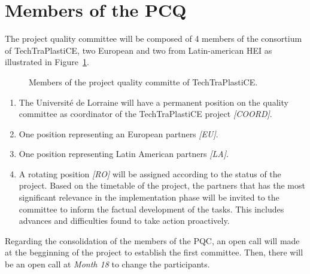 \documentclass[
  12pt,
  oneside]{book}
\providecommand{\tightlist}{%
  \setlength{\itemsep}{0pt}\setlength{\parskip}{0pt}}\usepackage{longtable,booktabs,array}
\begin{document}
\section{Members of the PCQ}\label{members-of-the-pcq}

The project quality committee will be composed of 4 members of the
consortium of TechTraPlastiCE, two European and two from Latin-american
HEI as illustrated in Figure~\ref{fig-members}.

\begin{figure}[H]


\caption{\label{fig-members}Members of the project quality committe of
TechTraPlastiCE.}

\end{figure}%

\begin{enumerate}
\def\labelenumi{\arabic{enumi}.}
\tightlist
\item
  The Université de Lorraine will have a permanent position on the
  quality committee as coordinator of the TechTraPlastiCE project
  \emph{{[}COORD{]}}.
\item
  One position representing an European partners \emph{{[}EU{]}}.
\item
  One position representing Latin American partners \emph{{[}LA{]}}.
\item
  A rotating position \emph{{[}RO{]}} will be assigned according to the
  status of the project. Based on the timetable of the project, the
  partners that has the most significant relevance in the implementation
  phase will be invited to the committee to inform the factual
  development of the tasks. This includes advances and difficulties
  found to take action proactively.
\end{enumerate}

Regarding the consolidation of the members of the PQC, an open call will
made at the begginning of the project to establish the first committee.
Then, there will be an open call at \emph{Month 18} to change the
participants.
\end{document}
